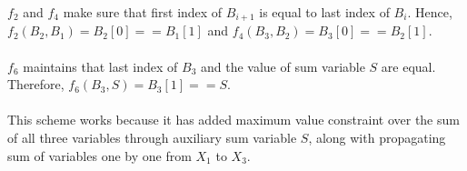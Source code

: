 \documentclass[12pt]{article}
\begin{document}
\begin{enumerate}[label=(\alph*)]
  $f_2$ and $f_4$ make sure that first index of $B_{i+1}$ is equal to last index of $B_{i}$. Hence, $f_2(B_2, B_1) = B_2[0] == B_1[1]$ and $f_4(B_3, B_2) = B_3[0] == B_2[1]$. \\ \\
  $f_6$ maintains that last index of $B_3$ and the value of sum variable $S$ are equal. Therefore, $f_6(B_3, S) = B_3[1] == S$. \\ \\
  This scheme works because it has added maximum value constraint over the sum of all three variables through auxiliary sum variable $S$, along with propagating sum of variables one by one from $X_1$ to $X_3$.
\end{enumerate}
\end{document}
